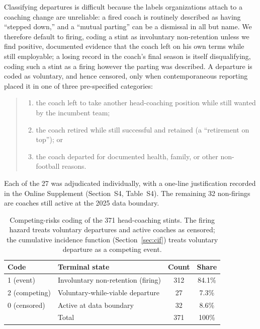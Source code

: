 \documentclass[12pt,USenglish]{article}
\begin{document}
Classifying departures is difficult because the labels organizations attach to a coaching change are unreliable: a fired coach is routinely described as having ``stepped down,'' and a ``mutual parting'' can be a dismissal in all but name. We therefore default to firing, coding a stint as involuntary non-retention unless we find positive, documented evidence that the coach left on his own terms while still employable; a losing record in the coach's final season is itself disqualifying, coding such a stint as a firing however the parting was described. A departure is coded as voluntary, and hence censored, only when contemporaneous reporting placed it in one of three pre-specified categories:
\begin{quote}
\begin{enumerate}
\item[(A)] the coach left to take another head-coaching position while still wanted by the incumbent team;
\item[(B)] the coach retired while still successful and retained (a ``retirement on top''); or
\item[(C)] the coach departed for documented health, family, or other non-football reasons.
\end{enumerate}
\end{quote}
Each of the 27 was adjudicated individually, with a one-line justification recorded in the Online Supplement (Section~S4, Table~S4). The remaining 32 non-firings are coaches still active at the 2025 data boundary.

\begin{table}[!ht]
\caption{Competing-risks coding of the 371 head-coaching stints. The firing hazard treats voluntary departures and active coaches as censored; the cumulative incidence function (Section~\ref{sec:cif}) treats voluntary departure as a competing event.}
\label{tab:events}
\small
\begin{tabular}{llcc}
\toprule
Code & Terminal state & Count & Share \\
\midrule
1 (event) & Involuntary non-retention (firing) & 312 & 84.1\% \\
2 (competing) & Voluntary-while-viable departure & 27 & 7.3\% \\
0 (censored) & Active at data boundary & 32 & 8.6\% \\
\midrule
& Total & 371 & 100\% \\
\bottomrule
\end{tabular}
\end{table}
\end{document}
